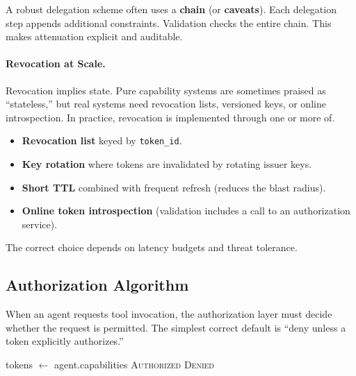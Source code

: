 A robust delegation scheme often uses a \textbf{chain} (or \textbf{caveats}). Each delegation step appends additional constraints. Validation checks the entire chain. This makes attenuation explicit and auditable.

\paragraph{Revocation at Scale.}
Revocation implies state. Pure capability systems are sometimes praised as ``stateless,'' but real systems need revocation lists, versioned keys, or online introspection. In practice, revocation is implemented through one or more of.
\begin{itemize}
\item \textbf{Revocation list} keyed by \texttt{token\_id}.
\item \textbf{Key rotation} where tokens are invalidated by rotating issuer keys.
\item \textbf{Short TTL} combined with frequent refresh (reduces the blast radius).
\item \textbf{Online token introspection} (validation includes a call to an authorization service).
\end{itemize}
The correct choice depends on latency budgets and threat tolerance.

\subsection{Authorization Algorithm}

When an agent requests tool invocation, the authorization layer must decide whether the request is permitted. The simplest correct default is ``deny unless a token explicitly authorizes.''

\begin{algorithm}
\caption{Tool Authorization}
\begin{algorithmic}[1]
    \State tokens $\gets$ agent.capabilities
                                \State \Return \textsc{Authorized}
                            \EndIf
                        \EndIf
                    \EndIf
                \EndIf
            \EndIf
        \EndIf
    \EndFor
    \State \Return \textsc{Denied}
\EndFunction
\end{algorithmic}
\end{algorithm}

